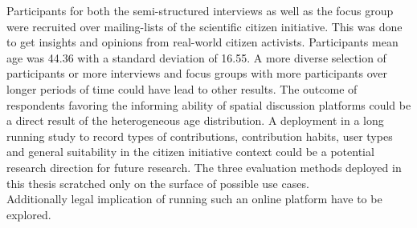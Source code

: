 Participants for both the semi-structured interviews as well as the focus group were recruited over mailing-lists of the scientific citizen initiative. This was done to get insights and opinions from real-world citizen activists. Participants mean age was 44.36 with a standard deviation of 16.55. A more diverse selection of participants or more interviews and focus groups with more participants over longer periods of time could have lead to other results. The outcome of respondents favoring the informing ability of spatial discussion platforms could be a direct result of the heterogeneous age distribution. A deployment in a long running study to record types of contributions, contribution habits, user types and general suitability in the citizen initiative context could be a potential research direction for future research. The three evaluation methods deployed in this thesis scratched only on the surface of possible use cases.\\
Additionally legal implication of running such an online platform have to be explored.


